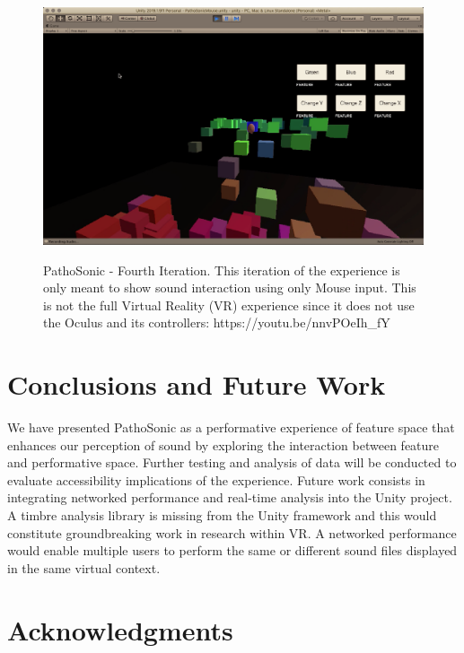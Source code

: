 \documentclass{nime-alternate}
\begin{document}
\begin{figure}[htbp]
       \centering
              \includegraphics[width=1\textwidth]{screen-rec.png}
       \label{PathoSonic - Fourth Iteration. This iteration of the experience is only meant to show sound interaction using only Mouse input. This is not the full Virtual Reality (VR) experience since it does not use the Oculus and its controllers: https://youtu.be/nnvPOeIh_fY}
       \caption{PathoSonic - Fourth Iteration. This iteration of the experience is only meant to show sound interaction using only Mouse input. This is not the full Virtual Reality (VR) experience since it does not use the Oculus and its controllers: https://youtu.be/nnvPOeIh\_fY}
\end{figure}


\section{Conclusions and Future Work}

We have presented PathoSonic as a performative experience of feature space that enhances our perception of sound by exploring the interaction between feature and performative space. Further testing and analysis of data will be conducted to evaluate accessibility implications of the experience. Future work consists in integrating networked performance and real-time analysis into the Unity project. A timbre analysis library is missing from the Unity framework and this would constitute groundbreaking work in research within VR. A networked performance would enable multiple users to perform the same or different sound files displayed in the same virtual context. 

\section{Acknowledgments}
\end{document}
